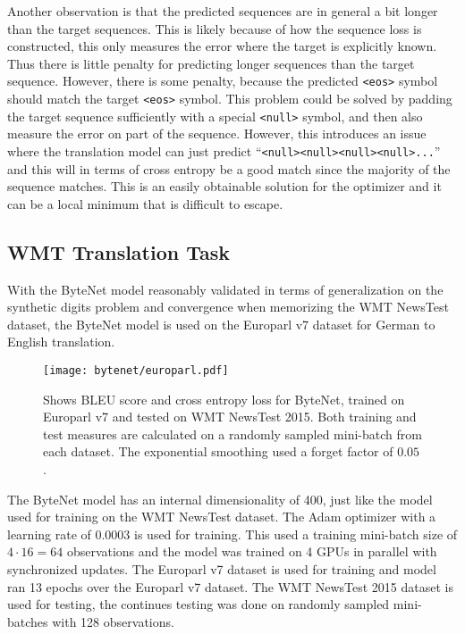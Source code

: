 Another observation is that the predicted sequences are in general a bit longer than the target sequences. This is likely because of how the sequence loss is constructed, this only measures the error where the target is explicitly known. Thus there is little penalty for predicting longer sequences than the target sequence. However, there is some penalty, because the predicted \texttt{<eos>} symbol should match the target \texttt{<eos>} symbol. This problem could be solved by padding the target sequence sufficiently with a special \texttt{<null>} symbol, and then also measure the error on part of the sequence. However, this introduces an issue where the translation model can just predict ``\texttt{<null><null><null><null>...}'' and this will in terms of cross entropy be a good match since the majority of the sequence matches. This is an easily obtainable solution for the optimizer and it can be a local minimum that is difficult to escape.

\clearpage
\subsection{WMT Translation Task}

With the ByteNet model reasonably validated in terms of generalization on the synthetic digits problem and convergence when memorizing the WMT NewsTest dataset, the ByteNet model is used on the Europarl v7 dataset for German to English translation.

\begin{figure}[h]
    \centering
    \texttt{[image: bytenet/europarl.pdf]}
    \caption{Shows BLEU score and cross entropy loss for ByteNet, trained on Europarl v7 and tested on WMT NewsTest 2015. Both training and test measures are calculated on a randomly sampled mini-batch from each dataset. The exponential smoothing used a forget factor of $0.05$.}
    \label{fig:result:bytenet:europarl}
\end{figure}

The ByteNet model has an internal dimensionality of 400, just like the model used for training on the WMT NewsTest dataset. The Adam optimizer with a learning rate of 0.0003 is used for training. This used a training mini-batch size of $4 \cdot 16 = 64$ observations and the model was trained on 4 GPUs in parallel with synchronized updates. The Europarl v7 dataset is used for training and model ran 13 epochs over the Europarl v7 dataset. The WMT NewsTest 2015 dataset is used for testing, the continues testing was done on randomly sampled mini-batches with 128 observations.

